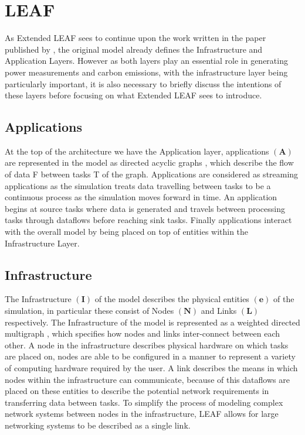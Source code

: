 \documentclass{l4proj}
\begin{document}
\section{LEAF}\label{sec:LEAF}
As Extended LEAF sees to continue upon the work written in the paper published by \cite{leaf2021}, the original model already defines the Infrastructure and Application Layers.
However as both layers play an essential role in generating power measurements and carbon emissions, with the infrastructure layer being particularly important, it is also necessary to briefly discuss the intentions of these layers before focusing on what Extended LEAF sees to introduce.

\subsection{Applications}\label{subsec:applications}
At the top of the architecture we have the Application layer, applications $\mathbf{(A)}$ are represented in the model as directed acyclic graphs \citep{leaf2021}, which describe the flow of data F between tasks T of the graph.
Applications are considered as streaming applications as the simulation treats data travelling between tasks to be a continuous process as the simulation moves forward in time.
An application begins at source tasks where data is generated and travels between processing tasks through dataflows before reaching sink tasks.
Finally applications interact with the overall model by being placed on top of entities within the Infrastructure Layer.

\subsection{Infrastructure}\label{subsec:infrastructure}
The Infrastructure $\mathbf{(I)}$ of the model describes the physical entities $\mathbf{(e)}$ of the simulation, in particular these consist of Nodes $\mathbf{(N)}$ and Links $\mathbf{(L)}$ respectively.
The Infrastructure of the model is represented as a weighted directed multigraph \citep{leaf2021}, which specifies how nodes and links inter-connect between each other.
A node in the infrastructure describes physical hardware on which tasks are placed on, nodes are able to be configured in a manner to represent a variety of computing hardware required by the user.
A link describes the means in which nodes within the infrastructure can communicate, because of this dataflows are placed on these entities to describe the potential network requirements in transferring data between tasks.
To simplify the process of modeling complex network systems between nodes in the infrastructure, LEAF allows for large networking systems to be described as a single link.
\end{document}
